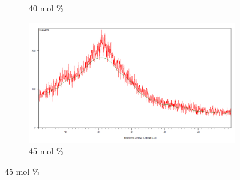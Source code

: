 \documentclass[12pt, a4paper]{article}
\begin{document}
\begin{figure}[h]
\begin{subfigure}[b]{0.23\textwidth}
  \caption{40 mol \% }
  \label{fig:sub3}
\end{subfigure}
\hfill
\begin{subfigure}[b]{0.23\textwidth}
  \centering
  \includegraphics[width=\linewidth]{45pro.png}
  \caption{45 mol \% }
  \label{fig:sub4}
\end{subfigure}

\vspace{0.8em}


\end{figure}
\end{document}
